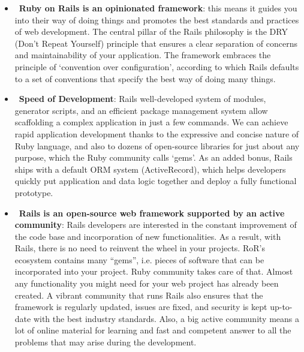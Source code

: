 \begin{itemize}
\item~\textbf{Ruby on Rails is an opinionated framework}: this means it guides you into their way of doing things and promotes the best standards and practices of web development. The central pillar of the Rails philosophy is the DRY (Don’t Repeat Yourself) principle that ensures a clear separation of concerns and maintainability of your application. The framework embraces the principle of ‘convention over configuration’, according to which Rails defaults to a set of conventions that specify the best way of doing many things.

\item~\textbf{Speed of Development}: Rails well-developed system of modules, generator scripts, and an efficient package management system allow scaffolding a complex application in just a few commands. We can achieve rapid application development thanks to the expressive and concise nature of Ruby language, and also to dozens of open-source libraries for just about any purpose, which the Ruby community calls ‘gems’. As an added bonus, Rails ships with a default ORM system (ActiveRecord), which helps developers quickly put application and data logic together and deploy a fully functional prototype.

\item~\textbf{Rails is an open-source web framework supported by an active community}: Rails developers are interested in the constant improvement of the code base and incorporation of new functionalities. As a result, with Rails, there is no need to reinvent the wheel in your projects. RoR’s ecosystem contains many “gems”, i.e. pieces of software that can be incorporated into your project. Ruby community takes care of that. Almost any functionality you might need for your web project has already been created. A vibrant community that runs Rails also ensures that the framework is regularly updated, issues are fixed, and security is kept up-to-date with the best industry standards. Also, a big active community means a lot of online material for learning and fast and competent answer to all the problems that may arise during the development.
\end{itemize}